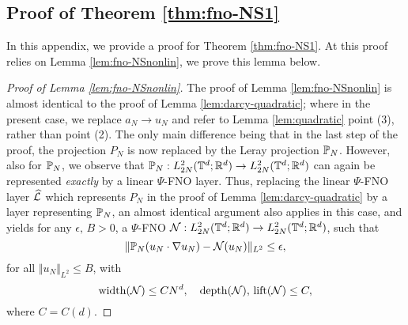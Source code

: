 \documentclass[reqno,a4paper]{amsart}
\begin{document}
\subsection{Proof of Theorem \ref{thm:fno-NS1}}
\label{app:NS1}
In this appendix, we provide a proof for Theorem \ref{thm:fno-NS1}. At this proof relies on Lemma \ref{lem:fno-NSnonlin}, we prove this lemma below. 
\begin{proof}[Proof of Lemma \ref{lem:fno-NSnonlin}]
The proof of Lemma \ref{lem:fno-NSnonlin} is almost identical to the proof of Lemma \ref{lem:darcy-quadratic}; where in the present case, we replace $a_N \to u_N$ and refer to Lemma \ref{lem:quadratic} point (3), rather than point (2). The only main difference being that in the last step of the proof, the projection $P_N$ is now replaced by the Leray projection $\P_N$. However, also for $\P_N$, we observe that $\P_N: L^2_{2N}(\T^d;\R^d) \to L^2_{2N}(\T^d;\R^d)$ can again be represented \emph{exactly} by a linear $\Psi$-FNO layer. Thus, replacing the linear $\Psi$-FNO layer $\hL$ which represents $P_N$ in the proof of Lemma \ref{lem:darcy-quadratic} by a layer representing $\P_N$, an almost identical argument also applies in this case, and yields for any $\epsilon, \, B > 0$, a $\Psi$-FNO $\cN: L^2_{2N}(\T^d;\R^d) \to L^2_{2N}(\T^d;\R^d)$, such that
\[
\Vert \P_N(u_N \cdot \nabla u_N) - \cN(u_N)\Vert_{L^2}\le \epsilon,
\]
for all $\Vert u_N \Vert_{L^2} \le B$, with
\[
\width(\cN) \le C N^d, 
\quad
\depth(\cN), \, \lift(\cN) \le C,
\]
where $C = C(d)$.
\end{proof}
\end{document}
